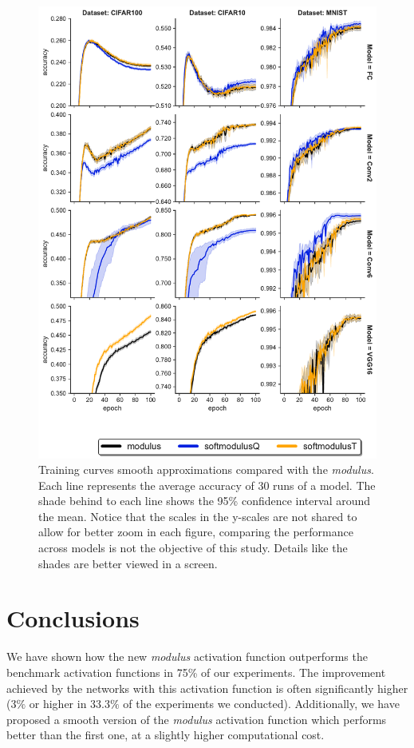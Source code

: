 \documentclass[authoryear]{elsarticle}
\begin{document}
\begin{figure}[h!]
	\centering
	\includegraphics[width=1.0\linewidth]{figs/training_curves_smooth}
	\caption{Training curves smooth approximations compared with the \textit{modulus}. Each line represents the average accuracy of 30 runs of a model. The shade behind to each line shows the 95\% confidence interval around the mean. Notice that the scales in the y-scales are not shared to allow for better zoom in each figure, comparing the performance across models is not the objective of this study. Details like the shades are better viewed in a screen.}
	\label{fig:training_curves_smooth}
\end{figure}



\section{Conclusions} \label{sec:conclusions}
We have shown how the new \textit{modulus} activation function outperforms the benchmark activation functions in 75\% of our experiments. The improvement achieved by the networks with this activation function is often significantly higher ($3\%$ or higher in 33.3$\%$ of the experiments we conducted). Additionally, we have proposed a smooth version of the \textit{modulus} activation function which performs better than the first one, at a slightly higher computational cost. 
\end{document}
